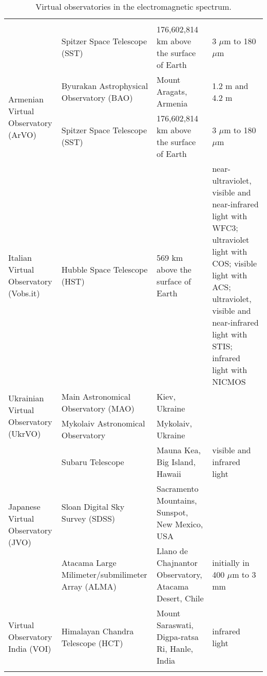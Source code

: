 \begin{center}
\begin{longtable}{|m{3cm}|m{3cm}|m{3cm}|m{5cm}|}
     \cite{website:Chandra_EMS} \\
     \cline{2-4}
     & Spitzer Space Telescope (SST) & 176,602,814 km above the surface of Earth
     \cite{website:SST_EMS_1} & 3 $ \mu $m to 180 $ \mu $m
     \cite{website:SST_EMS_2} \\
    \hline
    \multirow{2}{3cm}{Armenian Virtual Observatory (ArVO)} & Byurakan
    Astrophysical Observatory (BAO) & Mount Aragats, Armenia & 1.2 m and 4.2 m
    \cite{website:BAO_EMS} \\
     \cline{2-4}
     & Spitzer Space Telescope (SST) & 176,602,814 km above the surface of Earth
     & 3 $ \mu $m to 180 $ \mu $m \\
    \hline
    Italian Virtual Observatory (Vobs.it) & Hubble Space Telescope (HST) & 569
    km above the surface of Earth & near-ultraviolet, visible and near-infrared
    light with WFC3; ultraviolet light with COS; visible light with ACS;
    ultraviolet, visible and near-infrared light with STIS; infrared light with
    NICMOS \\
    \hline
    \multirow{2}{3cm}{Ukrainian Virtual Observatory (UkrVO)} & Main Astronomical
    Observatory (MAO) & Kiev, Ukraine & \\
     \cline{2-4}
     & Mykolaiv Astronomical Observatory & Mykolaiv, Ukraine & \\
    \hline
    \multirow{3}{3cm}{Japanese Virtual Observatory (JVO)} & Subaru Telescope &
    Mauna Kea, Big Island, Hawaii & visible and infrared light
    \cite{website:Subaru_EMS} \\
     \cline{2-4}
     & Sloan Digital Sky Survey (SDSS) & Sacramento Mountains, Sunspot, New
     Mexico, USA & \\
     \cline{2-4} 
     & Atacama Large Milimeter/submilimeter Array (ALMA) & Llano de Chajnantor
     Observatory, Atacama Desert, Chile & initially in 400 $ \mu $m to 3 mm
     \cite{website:ALMA_EMS} \\
    \hline
    Virtual Observatory India (VOI) & Himalayan Chandra Telescope (HCT) & Mount
    Saraswati, Digpa-ratsa Ri, Hanle, India & infrared light 
    \cite{website:HCT_EMS} \\
    \hline
\caption{Virtual observatories in the electromagnetic spectrum.}
\label{table:vo_EMS}
\end{longtable}
\end{center}
